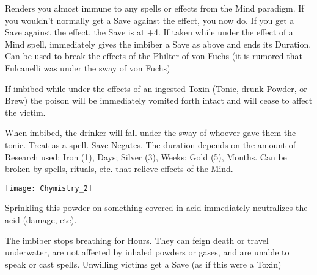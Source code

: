 {\CHYMISTRY[
  Name=Fulcanelli's Clarifying Elixir,
  Link=chymistry-fulcanelli-clarifying-elixir,
  Cost=Silver (3),
  Duration=until Bivouac/0,
  Toxin=No,
  Narcotic=No 
]


Renders you almost immune to any spells or effects from the Mind paradigm.  If you wouldn't normally get a Save against the effect, you now do.  If you  get a Save against the effect, the Save is at +4.  If taken while under the effect of a Mind spell, immediately gives the imbiber a Save as above and ends its Duration.  Can be used to break the effects of the Philter of von Fuchs (it is rumored that Fulcanelli was under the sway of von Fuchs)

\CHYMISTRY[
  Name=Liebnitz Purgation,
  Link=chymistry-liebnitz-purgation,
  Cost=Silver (3),
  Duration=0 ,
  Toxin=No,
  Narcotic=No 
]

If imbibed while under the effects of an ingested Toxin (Tonic, drunk Powder, or Brew) the poison will be immediately vomited forth intact and will cease to affect the victim.  

\CHYMISTRY[
  Name=Philter of von Fuchs,
  Link=chymistry-philter-von-Fuchs,
  Cost=See Below,
  Duration=See Below,
  Toxin=Yes,
  Narcotic=No 
]

When imbibed, the drinker will fall under the sway of whoever gave them the tonic.  Treat as a  spell.  Save Negates.  The duration depends on the amount of Research used:  Iron (1), Days; Silver (3), Weeks; Gold (5), Months.  Can be broken by spells, rituals, etc. that relieve effects of the Mind.

  \begin{center}
  \texttt{[image: Chymistry\_2]}
  \end{center}



  \CHYMISTRY[
    Name=Dastin's Basic Talc,
    Link=chymistry-dastins-basic-talc,
    Cost=Iron (1),
    Duration=0 ,
    Toxin=No,
    Narcotic=No 
  ]


  Sprinkling this powder on something covered in acid immediately neutralizes the acid (damage, etc).


  \CHYMISTRY[
    Name=Mermaid's Kiss,
    Link=chymistry-mermaids-kiss,
    Cost=Silver (3),
    Duration=0 ,
    Toxin=Yes,
    Narcotic=No 
  ]


  The imbiber stops breathing for Hours.  They can feign death or travel underwater, are not affected by inhaled powders or gases, and are unable to speak or cast spells.  Unwilling victims get a Save (as if this were a Toxin)



}
